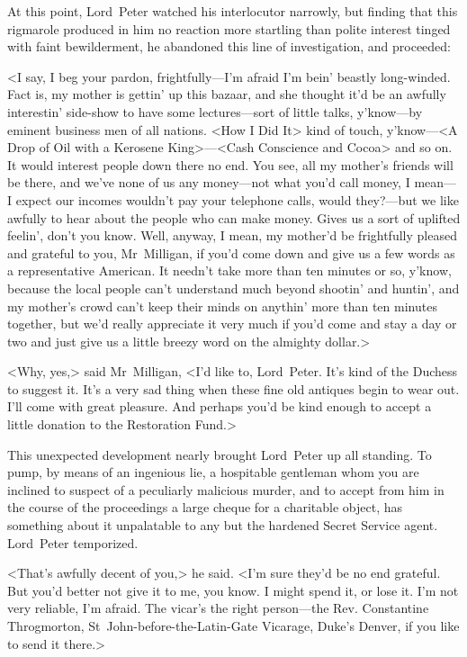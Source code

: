 At this point, Lord~Peter watched his interlocutor narrowly, but finding that this rigmarole produced in him no reaction more startling than polite interest tinged with faint bewilderment, he abandoned this line of investigation, and proceeded:

<I say, I beg your pardon, frightfully—I'm afraid I'm bein' beastly long-winded. Fact is, my mother is gettin' up this bazaar, and she thought it'd be an awfully interestin' side-show to have some lectures—sort of little talks, y'know—by eminent business men of all nations. <How I Did It> kind of touch, y'know—<A Drop of Oil with a Kerosene King>—<Cash Conscience and Cocoa> and so on. It would interest people down there no end. You see, all my mother's friends will be there, and we've none of us any money—not what you'd call money, I mean—I expect our incomes wouldn't pay your telephone calls, would they?—but we like awfully to hear about the people who can make money. Gives us a sort of uplifted feelin', don't you know. Well, anyway, I mean, my mother'd be frightfully pleased and grateful to you, Mr~Milligan, if you'd come down and give us a few words as a representative American. It needn't take more than ten minutes or so, y'know, because the local people can't understand much beyond shootin' and huntin', and my mother's crowd can't keep their minds on anythin' more than ten minutes together, but we'd really appreciate it very much if you'd come and stay a day or two and just give us a little breezy word on the almighty dollar.>

<Why, yes,> said Mr~Milligan, <I'd like to, Lord~Peter. It's kind of the Duchess to suggest it. It's a very sad thing when these fine old antiques begin to wear out. I'll come with great pleasure. And perhaps you'd be kind enough to accept a little donation to the Restoration Fund.>

This unexpected development nearly brought Lord~Peter up all standing. To pump, by means of an ingenious lie, a hospitable gentleman whom you are inclined to suspect of a peculiarly malicious murder, and to accept from him in the course of the proceedings a large cheque for a charitable object, has something about it unpalatable to any but the hardened Secret Service agent. Lord~Peter temporized.

<That's awfully decent of you,> he said. <I'm sure they'd be no end grateful. But you'd better not give it to me, you know. I might spend it, or lose it. I'm not very reliable, I'm afraid. The vicar's the right person—the Rev. Constantine Throgmorton, St~John-before-the-Latin-Gate Vicarage, Duke's Denver, if you like to send it there.>


